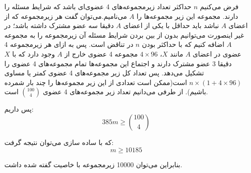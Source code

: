 \p
فرض می‌کنیم $n$ حداکثر تعداد زیرمجموعه‌های 4 عضوی‌ای باشد که شرایط مسئله را دارند. مجموعه این زیر مجموعه‌ها را $A$ می‌نامیم.می‌توان گفت هر زیرمجموعه که از اعضای $A$ نباشد باید حداقل با یکی از اعضای $A$ دقیقا سه عضو مشترک داشته باشد؛ در غیر اینصورت می‌توانیم بدون از بین بردن شرایط مسئله آن زیرمجموعه را به مجموعه $A$ اضافه کنیم که با حداکثر بودن $n$ در تناقض است. پس به ازای هر زیرمجموعه 4 عضوی در اعضای $A$ مانند $X$، $4 \times 96$ مجموعه 4 عضوی خارج از $A$ وجود دارد که با $X$ دقیقا 3 عضو مشترک دارند و اجتماع این مجموعه‌ها تمام مجموعه‌های 4 عضوی را تشکیل می‌دهد. پس تعداد کل زیر مجموعه‌های 4 عضوی کمتر یا مساوی $n \times (1 + 4 \times 96)$ است(ممکن است تعدادی از این زیر مجموعه‌ها را چند بار شمرده باشیم). از طرفی می‌دانیم تعداد زیر مجموعه‌های 4 عضوی $ 100 \choose 4 $ است.

	پس داریم:
	$$ 385m \ge { 100 \choose 4} $$

	که با ساده سازی می‌توان نتیجه گرفت:
    $$m \ge 10185$$
    
    بنابراین می‌توان 10000 زیرمجموعه با خاصیت گفته شده داشت.